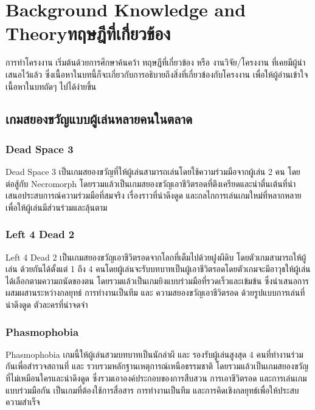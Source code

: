 \chapter{\ifenglish Background Knowledge and Theory\else ทฤษฎีที่เกี่ยวข้อง\fi}

การทำโครงงาน เริ่มต้นด้วยการศึกษาค้นคว้า ทฤษฎีที่เกี่ยวข้อง หรือ งานวิจัย/โครงงาน ที่เคยมีผู้นำเสนอไว้แล้ว ซึ่งเนื้อหาในบทนี้ก็จะเกี่ยวกับการอธิบายถึงสิ่งที่เกี่ยวข้องกับโครงงาน เพื่อให้ผู้อ่านเข้าใจเนื้อหาในบทถัดๆ ไปได้ง่ายขึ้น

\section{เกมสยองขวัญแบบผู้เล่นหลายคนในตลาด}
\subsection{Dead Space 3}

Dead Space 3 เป็นเกมสยองขวัญที่ให้ผู้เล่นสามารถเล่นโดยใช้ความร่วมมือจากผู้เล่น 2 คน โดยต่อสู้กับ Necromorph โดยรวมแล้วเป็นเกมสยองขวัญเอาชีวิตรอดที่ตึงเครียดและน่าตื่นเต้นที่นำเสนอประสบการณ์ความร่วมมือที่สมจริง เรื่องราวที่น่าดึงดูด และกลไกการเล่นเกมใหม่ที่หลากหลายเพื่อให้ผู้เล่นมีส่วนร่วมและลุ้นตาม

\subsection{Left 4 Dead 2}

Left 4 Dead 2 เป็นเกมสยองขวัญเอาชีวิตรอดจากโลกที่เต็มไปด้วยฝูงผีดิบ โดยตัวเกมสามารถให้ผู้เล่น ด้วยกันได้ตั้งแต่ 1 ถึง 4 คนโดยผู้เล่นจะรับบทบาทเป็นผู้เอาชีวิตรอดโดยตัวเกมจะมีอาวุธให้ผู้เล่นได้เลือกตามความถนัดของตน โดยรวมแล้วเป็นเกมยิงแบบร่วมมือที่รวดเร็วและเข้มข้น ซึ่งนำเสนอการผสมผสานระหว่างกลยุทธ์ การทำงานเป็นทีม และ ความสยองขวัญเอาชีวิตรอด ด้วยรูปแบบการเล่นที่น่าดึงดูด ตัวละครที่น่าจดจำ

\subsection{Phasmophobia}

Phasmophobia เกมนี้ให้ผู้เล่นสวมบทบาทเป็นนักล่าผี และ รองรับผู้เล่นสูงสุด 4 คนที่ทำงานร่วมกันเพื่อสำรวจสถานที่ และ รวบรวมหลักฐานเหตุการณ์เหนือธรรมชาติ โดยรวมแล้วเป็นเกมสยองขวัญที่ไม่เหมือนใครและน่าดึงดูด ซึ่งรวมเอาองค์ประกอบของการสืบสวน การเอาชีวิตรอด และการเล่นเกมแบบร่วมมือกัน เป็นเกมที่ต้องใช้การสื่อสาร การทำงานเป็นทีม และการคิดเชิงกลยุทธ์เพื่อให้ประสบความสำเร็จ 


